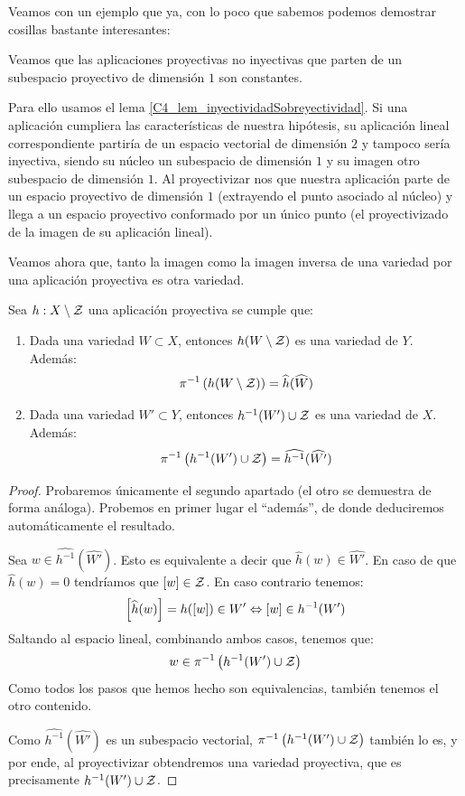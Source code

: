 Veamos con un ejemplo que ya, con lo poco que sabemos podemos demostrar cosillas bastante interesantes:
\begin{exa}
	Veamos que las aplicaciones proyectivas no inyectivas que parten de un subespacio proyectivo de dimensión $1$ son constantes.
	
	Para ello usamos el lema \ref{C4_lem_inyectividadSobreyectividad}. Si una aplicación cumpliera las características de nuestra hipótesis, su aplicación lineal correspondiente partiría de un espacio vectorial de dimensión $2$ y tampoco sería inyectiva, siendo su núcleo un subespacio de dimensión $1$ y su imagen otro subespacio de dimensión $1$. Al proyectivizar nos que nuestra aplicación parte de un espacio proyectivo de dimensión $1$ (extrayendo el punto asociado al núcleo) y llega a un espacio proyectivo conformado por un único punto (el proyectivizado de la imagen de su aplicación lineal).
\end{exa}
Veamos ahora que, tanto la imagen como la imagen inversa de una variedad por una aplicación proyectiva es otra variedad.
\begin{lem}
	\label{C4_lem_preservaVariedades}
	Sea $h:X\setminus\mathcal{Z}$ una aplicación proyectiva se cumple que:
	\begin{enumerate}
		\item Dada una variedad $W\subset X$, entonces $h(W\setminus\mathcal{Z})$ es una variedad de $Y$. Además: \[\pi^{-1}\left(h(W\setminus \mathcal{Z})\right)=\widehat{h}(\widehat{W})\]
		\item Dada una variedad $W'\subset Y$, entonces $h^{-1}(W')\cup\mathcal{Z}$ es una variedad de $X$. Además: \[\pi^{-1}\left(h^{-1}(W')\cup\mathcal{Z}\right)=\widehat{h^{-1}}(\widehat{W'})\]
	\end{enumerate}
\end{lem}
\begin{proof}
	Probaremos únicamente el segundo apartado (el otro se demuestra de forma análoga). Probemos en primer lugar el ``además'', de donde deduciremos automáticamente el resultado.
	
	Sea $w\in \widehat{h^{-1}}(\widehat{W'})$. Esto es equivalente a decir que $\widehat{h}(w)\in\widehat{W'}$. En caso de que $\widehat{h}(w)=0$ tendríamos que $\left [ w \right ]\in\mathcal{Z}$. En caso contrario tenemos:
	\[\left [ \widehat{h}(w) \right ]=h(\left [ w \right ])\in W'\Leftrightarrow\left [ w \right ]\in h^{-1}(W')\]
	Saltando al espacio lineal, combinando ambos casos, tenemos que:
	\[w\in\pi^{-1}\left(h^{-1}(W')\cup\mathcal{Z}\right)\]
	Como todos los pasos que hemos hecho son equivalencias, también tenemos el otro contenido.
	
	Como $\widehat{h^{-1}}(\widehat{W'})$ es un subespacio vectorial, $\pi^{-1}\left(h^{-1}(W')\cup\mathcal{Z}\right)$ también lo es, y por ende, al proyectivizar obtendremos una variedad proyectiva, que es precisamente $h^{-1}(W')\cup\mathcal{Z}$.
\end{proof}

